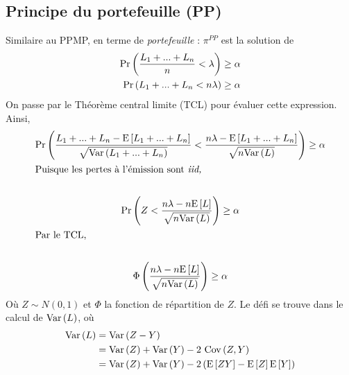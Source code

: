 \documentclass[10pt, french]{article}
\begin{document}
\begin{multicols*}{3}
\subsection{Principe du portefeuille (PP)}
Similaire au PPMP, en terme de \emph{portefeuille} : $\pi^{PP}$ est la solution de
\begin{align*}
\Pr \left( \frac{L_1 + ... + L_n}{n} < \lambda \right) &  \geq \alpha \\
\Pr \left( L_1 + ... + L_n < n \lambda \right) & \geq \alpha \\
\end{align*}
On passe par le Théorème central limite (TCL) pour évaluer cette expression. Ainsi,
\begin{gather*}
\Pr \left( \frac{L_1 + ... + L_n - \mathrm{E} \left[ L_1 + ... + L_n \right]}{\sqrt{\mathrm{Var} \left( L_1 + ... + L_n \right)}} < \frac{n \lambda - \mathrm{E} \left[ L_1 + ... + L_n \right]}{\sqrt{n \mathrm{Var} \left( L \right)}}   \right)  \geq \alpha \\
\shortintertext{Puisque les pertes à l'émission sont \emph{iid,}} \\
\Pr \left( Z < \frac{n \lambda - n \mathrm{E} \left[ L \right]}{\sqrt{n \mathrm{Var} \left( L \right)}} \right)  \geq \alpha \\
\shortintertext{Par le TCL,} \\
\Phi \left( \frac{n \lambda - n \mathrm{E} \left[ L \right]}{\sqrt{n \mathrm{Var} \left( L \right)}} \right)  \geq \alpha \\
\end{gather*}
Où $Z \sim N(0,1)$ et $\Phi$ la fonction de répartition de $Z$. Le défi se trouve dans le calcul de $\mathrm{Var} \left( L \right)$, où
\begin{align*}
\mathrm{Var} \left( L \right)	& = \mathrm{Var} \left( Z - Y \right) \\
& = \mathrm{Var} \left( Z \right) + \mathrm{Var} \left( Y \right) - 2 \  \mathrm{Cov} \left( Z, Y \right) \\
& = \mathrm{Var} \left( Z \right)  + \mathrm{Var} \left( Y \right) - 2 \left( \mathrm{E} \left[ ZY \right] - \mathrm{E} \left[ Z \right] \mathrm{E} \left[ Y \right] \right) \\
\end{align*}


\end{multicols*}
\end{document}
